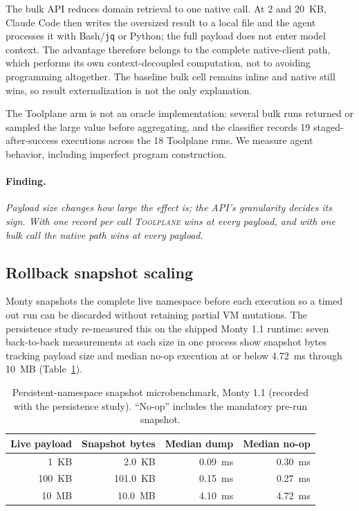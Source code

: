 \documentclass[10pt,twocolumn]{article}
\newcommand{\toolplane}{\textsc{Toolplane}\xspace}
\newcommand{\finding}[1]{\paragraph{Finding.} \emph{#1}}
\begin{document}
The bulk API reduces domain retrieval to one native call.  At 2 and 20~KB,
Claude Code then writes the oversized result to a local file and the agent
processes it with Bash/\texttt{jq} or Python; the full payload does not enter
model context.  The advantage therefore belongs to the complete native-client
path, which performs its own context-decoupled computation, not to avoiding
programming altogether.  The baseline bulk cell remains inline and native
still wins, so result externalization is not the only explanation.

The Toolplane arm is not an oracle implementation: several bulk runs returned or
sampled the large value before aggregating, and the classifier records 19
staged-after-success executions across the 18 Toolplane runs.  We measure agent
behavior, including imperfect program construction.

\finding{Payload size changes how large the effect is; the API's granularity decides
its sign.  With one record per call \toolplane wins at every payload, and with
one bulk call the native path wins at every payload.}



\subsection{Rollback snapshot scaling}

Monty snapshots the complete live namespace before each execution so a timed
out run can be discarded without retaining partial VM mutations.  The
persistence study re-measured this on the shipped Monty 1.1 runtime: seven
back-to-back measurements at each size in one process show snapshot bytes
tracking payload size and median no-op execution at or below 4.72~ms through
10~MB (Table~\ref{tab:snapshot}).

\begin{table}[t]
\centering
\small
\caption{Persistent-namespace snapshot microbenchmark, Monty 1.1 (recorded with
the persistence study).  ``No-op'' includes the mandatory pre-run
snapshot.}
\label{tab:snapshot}
\begin{tabular}{rrrr}
\toprule
Live payload & Snapshot bytes & Median dump & Median no-op \\
\midrule
1~KB & 2.0~KB & 0.09~ms & 0.30~ms \\
100~KB & 101.0~KB & 0.15~ms & 0.27~ms \\
10~MB & 10.0~MB & 4.10~ms & 4.72~ms \\
\bottomrule
\end{tabular}
\end{table}
\end{document}
